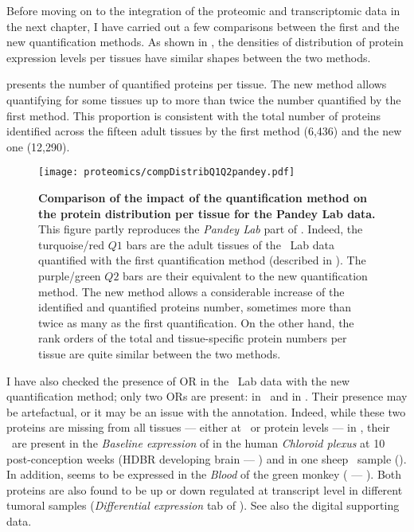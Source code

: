 Before moving on to the integration of the proteomic and transcriptomic data
in the next chapter,
I have carried out a few comparisons
between the first and the new quantification methods.
As shown in ,
the densities of distribution of protein expression levels per tissues
have similar shapes between the two methods.\mybr\

 presents the number of quantified proteins per tissue.
The new method allows quantifying for some tissues
up to more than twice the number quantified by the first method.
This proportion is consistent with the total number of proteins identified
across the fifteen adult tissues
by the first method (6,436)
and the new one (12,290).\mybr\

\begin{figure}[!ht]
    \texttt{[image: proteomics/compDistribQ1Q2pandey.pdf]}\centering
    \vspace{-3.5mm}
    \caption[Comparison of the impact of the quantification method on the
    protein distribution per tissue for Pandey Lab data]{\label{fig:pandeyQ1Q2comp}\textbf{Comparison of
    the impact of the quantification method on the protein distribution per tissue
    for the Pandey Lab data.}
    This figure partly reproduces the \emph{Pandey Lab} part
    of .
    Indeed, the turquoise/red $Q1$ bars are the adult tissues of the \pandey\ Lab data
    quantified with the first quantification method
    (described in ).
    The purple/green $Q2$ bars are their equivalent
    to the new quantification method.
    The new method allows a considerable increase of
    the identified and quantified proteins number,
    sometimes more than twice as many as the first quantification.
    On the other hand,
    the rank orders of the total and tissue-specific protein numbers per tissue
    are quite similar between the two methods.
    }
\end{figure}

I have also checked the presence of \gls{OR} in the \pandey\ Lab data
with the new quantification method;
only two \glspl{OR} are present:
 in \Kidney\ and  in \Liver.
Their presence may be artefactual, or it may be an issue with the annotation.
Indeed, while these two proteins are missing from all tissues
--- either at \RNA\ or protein levels
--- in ,
their \mRNAs\ are present
in the \emph{Baseline expression} of 
in the human \textit{Chloroid plexus} at 10 post-conception weeks
(HDBR developing brain --- )
and in one sheep \testis\ sample ().
In addition,  seems to be expressed in the \textit{Blood} of
the green monkey ( --- ).
Both proteins are also found to be up or down regulated at transcript level
in different tumoral samples (\emph{Differential expression} tab of \egxa).
See also the digital supporting data.\mybr\

